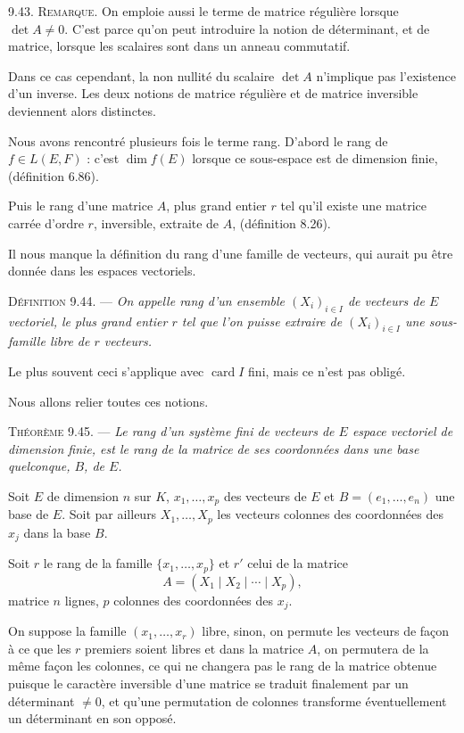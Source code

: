 \medskip\noindent\textsc{9.43. Remarque.} On emploie aussi le terme de matrice régulière lorsque $\det A\ne0$. C'est parce qu'on peut introduire la notion de déterminant, et de matrice, lorsque les scalaires sont dans un anneau commutatif.

Dans ce cas cependant, la non nullité du scalaire $\det A$ n'implique pas l'existence d'un inverse. Les deux notions de matrice régulière et de matrice inversible deviennent alors distinctes.


Nous avons rencontré plusieurs fois le terme rang. D'abord le rang de $f\in L(E,F)$ : c'est $\dim f(E)$ lorsque ce sous-espace est de dimension finie, (définition 6.86).

Puis le rang d'une matrice $A$, plus grand entier $r$ tel qu'il existe une matrice carrée d'ordre $r$, inversible, extraite de $A$, (définition 8.26).

Il nous manque la définition du rang d'une famille de vecteurs, qui aurait pu être donnée dans les espaces vectoriels.

\medskip\noindent\textsc{Définition 9.44.} --- \emph{On appelle rang d'un ensemble $(X_i)_{i\in I}$ de vecteurs de $E$ vectoriel, le plus grand entier $r$ tel que l'on puisse extraire de $(X_i)_{i\in I}$ une sous-famille libre de $r$ vecteurs.}

Le plus souvent ceci s'applique avec $\operatorname{card}I$ fini, mais ce n'est pas obligé.

Nous allons relier toutes ces notions.

\medskip\noindent\textsc{Théorème 9.45.} --- \emph{Le rang d'un système fini de vecteurs de $E$ espace vectoriel de dimension finie, est le rang de la matrice de ses coordonnées dans une base quelconque, $B$, de $E$.}

Soit $E$ de dimension $n$ sur $K$, $x_1,\ldots,x_p$ des vecteurs de $E$ et $B=(e_1,\ldots,e_n)$ une base de $E$. Soit par ailleurs $X_1,\ldots,X_p$ les vecteurs colonnes des coordonnées des $x_j$ dans la base $B$.

Soit $r$ le rang de la famille $\{x_1,\ldots,x_p\}$ et $r'$ celui de la matrice
\[
A=(X_1\mid X_2\mid\cdots\mid X_p),
\]
matrice $n$ lignes, $p$ colonnes des coordonnées des $x_j$.

On suppose la famille $(x_1,\ldots,x_r)$ libre, sinon, on permute les vecteurs de façon à ce que les $r$ premiers soient libres et dans la matrice $A$, on permutera de la même façon les colonnes, ce qui ne changera pas le rang de la matrice obtenue puisque le caractère inversible d'une matrice se traduit finalement par un déterminant $\ne0$, et qu'une permutation de colonnes transforme éventuellement un déterminant en son opposé.

